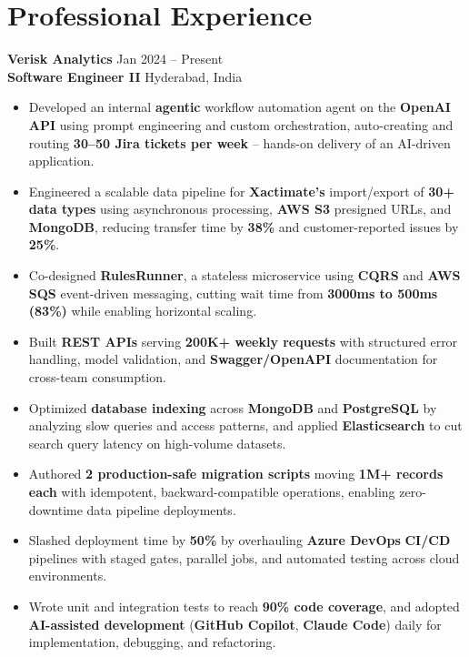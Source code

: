 \documentclass[a4paper,10pt]{article}
\begin{document}
\section*{Professional Experience}

\textbf{Verisk Analytics} \hfill Jan 2024 -- Present \\
\textbf{Software Engineer II} \hfill Hyderabad, India

\begin{itemize}[leftmargin=*]
    \item Developed an internal \textbf{agentic} workflow automation agent on the \textbf{OpenAI API} using prompt engineering and custom orchestration, auto-creating and routing \textbf{30--50 Jira tickets per week} -- hands-on delivery of an AI-driven application.
    \item Engineered a scalable data pipeline for \textbf{Xactimate's} import/export of \textbf{30+ data types} using asynchronous processing, \textbf{AWS S3} presigned URLs, and \textbf{MongoDB}, reducing transfer time by \textbf{38\%} and customer-reported issues by \textbf{25\%}.
    \item Co-designed \textbf{RulesRunner}, a stateless microservice using \textbf{CQRS} and \textbf{AWS SQS} event-driven messaging, cutting wait time from \textbf{3000ms to 500ms (83\%)} while enabling horizontal scaling.
    \item Built \textbf{REST APIs} serving \textbf{200K+ weekly requests} with structured error handling, model validation, and \textbf{Swagger/OpenAPI} documentation for cross-team consumption.
    \item Optimized \textbf{database indexing} across \textbf{MongoDB} and \textbf{PostgreSQL} by analyzing slow queries and access patterns, and applied \textbf{Elasticsearch} to cut search query latency on high-volume datasets.
    \item Authored \textbf{2 production-safe migration scripts} moving \textbf{1M+ records each} with idempotent, backward-compatible operations, enabling zero-downtime data pipeline deployments.
    \item Slashed deployment time by \textbf{50\%} by overhauling \textbf{Azure DevOps} \textbf{CI/CD} pipelines with staged gates, parallel jobs, and automated testing across cloud environments.
    \item Wrote unit and integration tests to reach \textbf{90\% code coverage}, and adopted \textbf{AI-assisted development} (\textbf{GitHub Copilot}, \textbf{Claude Code}) daily for implementation, debugging, and refactoring.
\end{itemize}
\end{document}
